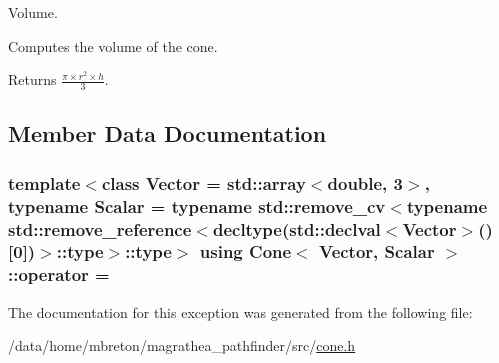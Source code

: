 Volume. 

Computes the volume of the cone. \begin{DoxyReturn}{Returns}
$\frac{\pi\times r^{2}\times h}{3}$. 
\end{DoxyReturn}


\subsection{Member Data Documentation}
\hypertarget{exceptionCone_a576e1736772f72874683b3788488a7d4}{
\subsubsection[{operator}]{\setlength{\rightskip}{0pt plus 5cm}template$<$class Vector = std\-::array$<$double, 3$>$, typename Scalar = typename std\-::remove\-\_\-cv$<$typename std\-::remove\-\_\-reference$<$decltype(std\-::declval$<$\-Vector$>$()\mbox{[}0\mbox{]})$>$\-::type$>$\-::type$>$ using {\bf Cone}$<$ Vector, Scalar $>$\-::operator = }}\label{exceptionCone_a576e1736772f72874683b3788488a7d4}


The documentation for this exception was generated from the following file\-:\begin{DoxyCompactItemize}
\item 
/data/home/mbreton/magrathea\-\_\-pathfinder/src/\hyperlink{cone_8h}{cone.\-h}\end{DoxyCompactItemize}
